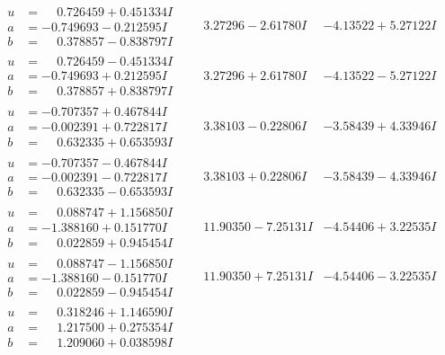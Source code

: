 \documentclass[1p]{elsarticle_modified}
\theoremstyle{definition}
\begin{document}
$$\begin{array}{c|c|c}
\begin{aligned}
u &= \phantom{-}0.726459 + 0.451334 I \\
a &= -0.749693 - 0.212595 I \\
b &= \phantom{-}0.378857 - 0.838797 I\end{aligned}
 & \phantom{-}3.27296 - 2.61780 I & -4.13522 + 5.27122 I \\ \hline\begin{aligned}
u &= \phantom{-}0.726459 - 0.451334 I \\
a &= -0.749693 + 0.212595 I \\
b &= \phantom{-}0.378857 + 0.838797 I\end{aligned}
 & \phantom{-}3.27296 + 2.61780 I & -4.13522 - 5.27122 I \\ \hline\begin{aligned}
u &= -0.707357 + 0.467844 I \\
a &= -0.002391 + 0.722817 I \\
b &= \phantom{-}0.632335 + 0.653593 I\end{aligned}
 & \phantom{-}3.38103 - 0.22806 I & -3.58439 + 4.33946 I \\ \hline\begin{aligned}
u &= -0.707357 - 0.467844 I \\
a &= -0.002391 - 0.722817 I \\
b &= \phantom{-}0.632335 - 0.653593 I\end{aligned}
 & \phantom{-}3.38103 + 0.22806 I & -3.58439 - 4.33946 I \\ \hline\begin{aligned}
u &= \phantom{-}0.088747 + 1.156850 I \\
a &= -1.388160 + 0.151770 I \\
b &= \phantom{-}0.022859 + 0.945454 I\end{aligned}
 & \phantom{-}11.90350 - 7.25131 I & -4.54406 + 3.22535 I \\ \hline\begin{aligned}
u &= \phantom{-}0.088747 - 1.156850 I \\
a &= -1.388160 - 0.151770 I \\
b &= \phantom{-}0.022859 - 0.945454 I\end{aligned}
 & \phantom{-}11.90350 + 7.25131 I & -4.54406 - 3.22535 I \\ \hline\begin{aligned}
u &= \phantom{-}0.318246 + 1.146590 I \\
a &= \phantom{-}1.217500 + 0.275354 I \\
b &= \phantom{-}1.209060 + 0.038598 I\end{aligned}

\end{array}$$
\end{document}
